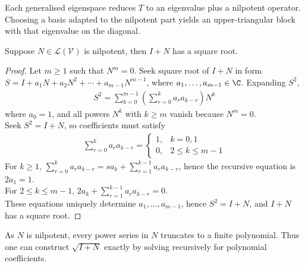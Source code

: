 Each generalised eigenspace reduces $T$ to an eigenvalue plus a nilpotent operator. Choosing a basis adapted to the nilpotent part yields an upper-triangular block with that eigenvalue on the diagonal.

\begin{lemma} \label{lem:nilpotentaddidenhassqrroot} Suppose $N \in \mathcal{L}(\mathcal{V})$ is nilpotent, then $I+N$ has a square root.
\begin{proof} Let $m \geq 1$ such that $N^m = 0$. Seek square root of $I+N$ in form $S = I + a_1 N + a_2 N^2 + \cdots + a_{m-1} N^{m-1}$, where $a_1, \ldots, a_{m-1} \in \C$. Expanding $S^2$,
\begin{align}
S^2 = \sum\limits_{k=0}^{m-1} \left( \sum\limits_{r=0}^k a_r a_{k-r} \right)N^k \nonumber
\end{align}
where $a_0 = 1$, and all powers $N^k$ with $k \geq m$ vanish because $N^m = 0$.\\
Seek $S^2 = I+N$, so coefficients must satisfy
\begin{align}
\sum\limits_{r=0}^k a_r a_{k-r} =
\begin{cases}
1, & k = 0, 1 \\
0, & 2 \leq k \leq m-1
\end{cases} \nonumber
\end{align}
For $k \geq 1$, $\sum\limits_{r=0}^k a_r a_{k-r} = s a_k + \sum\limits_{r=1}^{k-1} a_r a_{k-r}$, hence the recursive equation is $2a_1 = 1$.\\
For $2 \leq k \leq m-1$, $2 a_k + \sum\limits_{r=1}^{k-1} a_r a_{k-r} = 0$.\\
These equations uniquely determine $a_1, \ldots, a_{m-1}$, hence $S^2 = I + N$, and $I+N$ has a square root.
\end{proof}
\end{lemma}

As $N$ is nilpotent, every power series in $N$ truncates to a finite polynomial. Thus one can construct $\sqrt{I + N}$ exactly by solving recursively for polynomial coefficients.

